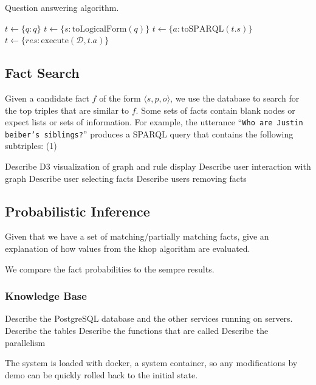 
\begin{algorithm}
  \caption{Question answering algorithm.}
  \label{alg:probqa-mainalgo}
  \begin{algorithmic}[1]
    \State$t \gets \{\mathit{q}: q\}$
    \State$t \gets \{\mathit{s}: \text{toLogicalForm}(q) \}$
    \State$t \gets \{\mathit{a}: \text{toSPARQL}(t.\mathit{s}) \}$
    \State$t \gets \{\mathit{res}: \text{execute}(\mathcal{D}, t.\mathit{a}) \}$
    \EndProcedure
  \end{algorithmic}
\end{algorithm}




\subsection{Fact Search}
\label{sec:probqa-search}

Given a candidate fact \(f\) of the form \(\langle s, p, o \rangle\), we use the
database to search for the top triples that are similar to \(f\).
Some sets of facts contain blank nodes or expect lists or sets of information.
For example, the utterance ``\texttt{Who are Justin beiber's siblings?}'' produces 
a SPARQL query that contains the following subtriples: (1)  

Describe D3 visualization of graph and rule display
Describe user interaction with graph
Describe user selecting facts
Describe users removing facts


\subsection{Probabilistic Inference}
\label{sec:probqa-inference}
Given that we have a set of matching/partially matching facts, give an explanation of how values from the khop algorithm are evaluated.

We compare the fact probabilities to the sempre results.

\subsubsection{Knowledge Base}

Describe the PostgreSQL database and the other services running on servers.
Describe the tables 
Describe the functions that are called
Describe the parallelism

The system is loaded with docker, a system container, so any modifications by demo can be quickly rolled back to the initial state.






